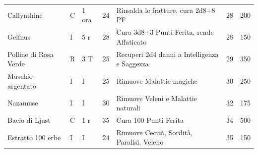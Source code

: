 \begin{xltabular}{\linewidth}{llllXcc}
	Callynthine & C& 1 ora& 24& Rinsalda le fratture, cura 2d8+8 PF & 28 & 200\\
 Gelfnus & I& 5 r & 28& Cura 3d8+3 Punti Ferita, rende Affaticato & 28 & 150 \\
	Polline di Rosa Verde & R& 3 T & 25& Recuperi 2d4 danni a Intelligenza e Saggezza& 29 & 350 \\
 Muschio argentato & I& I& 25& Rimuove Malattie magiche & 30 & 250\\
	Nazamuse & I& I& 30& Rimuove Veleni e Malattie naturali & 32 & 175\\
 Bacio di Ljust & C& 1 r & 35& Cura 100 Punti Ferita& 34 & 500\\
	Estratto 100 erbe & I& I& 24& Rimuove Cecità, Sordità, Paralisi, Veleno &35&150 \\
\end{xltabular}

